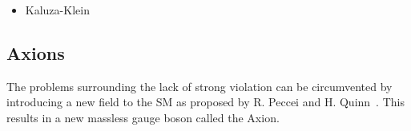 {\color{Red}
\begin{itemize}
\item Kaluza-Klein
\end{itemize}}


\subsection{Axions}
The problems surrounding the lack of strong \CP violation can be circumvented by introducing a new field to the SM as proposed by R. Peccei and H. Quinn~\cite{PhysRevLett.38.1440}. This results in a new massless gauge boson called the Axion.     

